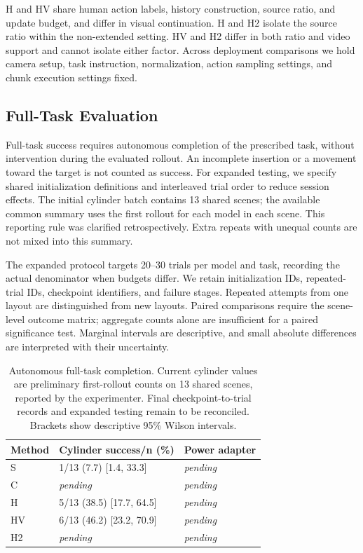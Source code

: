 \documentclass[letterpaper,10pt,conference]{ieeeconf}
\newcommand{\pending}{\textit{pending}}
\begin{document}
H and HV share human action labels, history construction, source ratio, and update budget, and differ in visual continuation. H and H2 isolate the source ratio within the non-extended setting. HV and H2 differ in both ratio and video support and cannot isolate either factor. Across deployment comparisons we hold camera setup, task instruction, normalization, action sampling settings, and chunk execution settings fixed.

\subsection{Full-Task Evaluation}
Full-task success requires autonomous completion of the prescribed task, without intervention during the evaluated rollout. An incomplete insertion or a movement toward the target is not counted as success. For expanded testing, we specify shared initialization definitions and interleaved trial order to reduce session effects. The initial cylinder batch contains 13 shared scenes; the available common summary uses the first rollout for each model in each scene. This reporting rule was clarified retrospectively. Extra repeats with unequal counts are not mixed into this summary.

The expanded protocol targets 20--30 trials per model and task, recording the actual denominator when budgets differ. We retain initialization IDs, repeated-trial IDs, checkpoint identifiers, and failure stages. Repeated attempts from one layout are distinguished from new layouts. Paired comparisons require the scene-level outcome matrix; aggregate counts alone are insufficient for a paired significance test. Marginal intervals are descriptive, and small absolute differences are interpreted with their uncertainty.

\begin{table}[t]
\centering\small
\caption{Autonomous full-task completion. Current cylinder values are preliminary first-rollout counts on 13 shared scenes, reported by the experimenter. Final checkpoint-to-trial records and expanded testing remain to be reconciled. Brackets show descriptive 95\% Wilson intervals.}
\label{tab:success}
\begin{tabular}{lll}
\toprule
Method & Cylinder success/n (\%) & Power adapter \\
\midrule
S & 1/13 (7.7) [1.4, 33.3] & \pending \\
C & \pending & \pending \\
H & 5/13 (38.5) [17.7, 64.5] & \pending \\
HV & 6/13 (46.2) [23.2, 70.9] & \pending \\
H2 & \pending & \pending \\
\bottomrule
\end{tabular}
\end{table}
\end{document}
